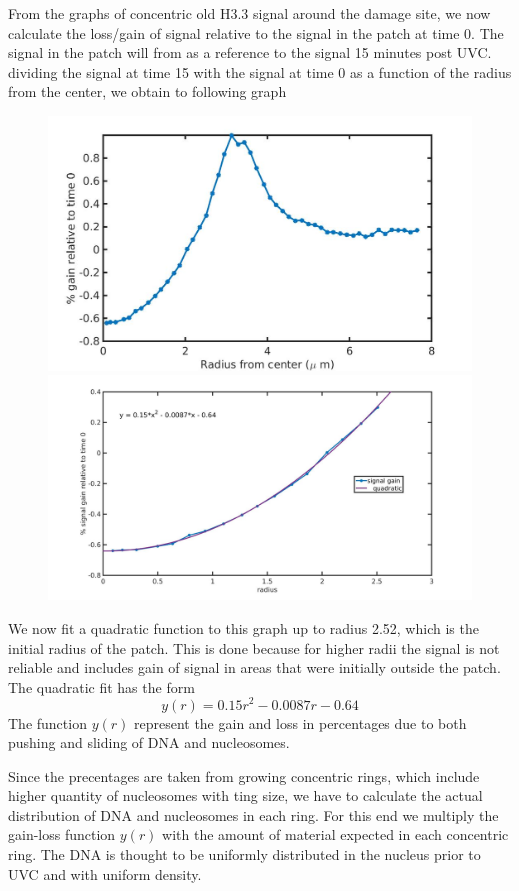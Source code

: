 \documentclass[12pt]{report}
\begin{document}
From the graphs of concentric old H3.3 signal around the damage site, we now calculate the loss/gain of signal relative to the signal in the patch at time 0. The signal in the patch will from as a reference to the signal 15 minutes post UVC. dividing the signal at time 15 with the signal at time 0 as a function of the radius from the center, we obtain to following graph

\begin{figure}[H]
\includegraphics[width=0.5\linewidth, height=0.3\textheight]{Images/patchExpansion/relativeGainNucleosomesConcentric}
\includegraphics[width=0.5\linewidth, height=0.3\textheight]{Images/patchExpansion/nucleosomeSignalGainConcentricFit}
\caption{}
\label{fig:relativeGainNucleosomesConcentric}
\end{figure}

We now fit a quadratic function to this graph up to radius 2.52, which is the initial radius of the patch. This is done because for higher radii the signal is not reliable and includes gain of signal in areas that were initially outside the patch. The quadratic fit has the form 
\begin{equation*}
y(r)=0.15r^2-0.0087r-0.64
\end{equation*}
The function $y(r)$ represent the gain and loss in percentages due to both pushing and sliding of DNA and nucleosomes. 

Since the precentages are taken from growing concentric rings, which include higher quantity of nucleosomes with ting size, we have to calculate the actual distribution of DNA and nucleosomes in each ring. For this end we multiply the gain-loss function $y(r)$ with the amount of material expected in each concentric ring. The DNA is thought to be uniformly distributed in the nucleus prior to UVC and with uniform density. 
\end{document}
